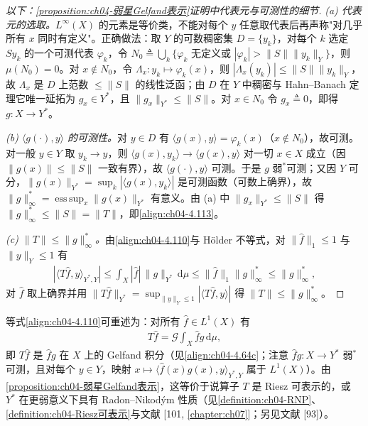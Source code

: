 \documentclass[../../main.tex]{subfiles}%
\begin{document}
\begin{proof}[以下：\cref{proposition:ch04-弱星Gelfand表示}证明中代表元与可测性的细节]
\emph{(a) 代表元的选取。}$L^\infty(X)$ 的元素是等价类，不能对每个 $y$ 任意取代表后再声称"对几乎所有 $x$ 同时有定义"。正确做法：取 $Y$ 的可数稠密集 $D=\{y_k\}$，对每个 $k$ 选定 $Sy_k$ 的一个可测代表 $\varphi_k$，令 $N_0\triangleq\bigcup_k\{\varphi_k\text{ 无定义或 }|\varphi_k|>\|S\|\|y_k\|_Y\}$，则 $\mu(N_0)=0$。对 $x\notin N_0$，令 $\Lambda_x:y_k\mapsto\varphi_k(x)$，则 $|\Lambda_x(y_k)|\leqslant\|S\|\|y_k\|_Y$，故 $\Lambda_x$ 是 $D$ 上范数 $\leqslant\|S\|$ 的线性泛函；由 $D$ 在 $Y$ 中稠密与 Hahn--Banach 定理它唯一延拓为 $g_x\in Y^*$，且 $\|g_x\|_{Y^*}\leqslant\|S\|$。对 $x\in N_0$ 令 $g_x\triangleq0$，即得 $g:X\to Y^*$。

\emph{(b) $\langle g(\cdot),y\rangle$ 的可测性。}对 $y\in D$ 有 $\langle g(x),y\rangle=\varphi_k(x)$（$x\notin N_0$），故可测。对一般 $y\in Y$ 取 $y_k\to y$，则 $\langle g(x),y_k\rangle\to\langle g(x),y\rangle$ 对一切 $x\in X$ 成立（因 $\|g(x)\|\leqslant\|S\|$ 一致有界），故 $\langle g(\cdot),y\rangle$ 可测。于是 $g$ 弱$^*$可测；又因 $Y$ 可分，$\|g(x)\|_{Y^*}=\sup_k|\langle g(x),y_k\rangle|$ 是可测函数（可数上确界），故 $\|g\|_\infty^*=\operatorname*{ess\,sup}_x\|g(x)\|_{Y^*}$ 有意义。由 (a) 中 $\|g_x\|_{Y^*}\leqslant\|S\|$ 得 $\|g\|_\infty^*\leqslant\|S\|=\|T\|$，即\eqref{align:ch04-4.113}。

\emph{(c) $\|T\|\leqslant\|g\|_\infty^*$。}由\eqref{align:ch04-4.110}与 Hölder 不等式，对 $\|\hat f\|_1\leqslant1$ 与 $\|y\|_Y\leqslant1$ 有
\begin{align*}
|\langle T\hat f,y\rangle_{Y^*,Y}|\leqslant\int_X|\hat f|\,\|g\|_{Y^*}\,\mathrm{d}\mu\leqslant\|\hat f\|_1\|g\|_\infty^*\leqslant\|g\|_\infty^*,
\end{align*}
对 $\hat f$ 取上确界并用 $\|T\hat f\|_{Y^*}=\sup_{\|y\|_Y\leqslant1}|\langle T\hat f,y\rangle|$ 得 $\|T\|\leqslant\|g\|_\infty^*$。
\end{proof}

\begin{remark}\label{remark:ch04-Gelfand表示}
等式\eqref{align:ch04-4.110}可重述为：对所有 $\hat f\in L^1(X)$ 有
\begin{align*}
T\hat f=\mathcal{G}\int_X\hat f g\,\mathrm{d}\mu,
\end{align*}
即 $T\hat f$ 是 $\hat f g$ 在 $X$ 上的 Gelfand 积分（见\eqref{align:ch04-4.64c}；注意 $\hat f g:X\to Y^*$ 弱$^*$可测，且对每个 $y\in Y$，映射 $x\mapsto\langle\hat f(x)g(x),y\rangle_{Y^*,Y}$ 属于 $L^1(X)$）。由\cref{proposition:ch04-弱星Gelfand表示}，这等价于说算子 $T$ 是 Riesz 可表示的，或 $Y^*$ 在更弱意义下具有 Radon--Nikodým 性质（见\cref{definition:ch04-RNP}、\cref{definition:ch04-Riesz可表示}与文献 [101, \cref{chapter:ch07}]；另见文献 [93]）。
\end{remark}
\end{document}
